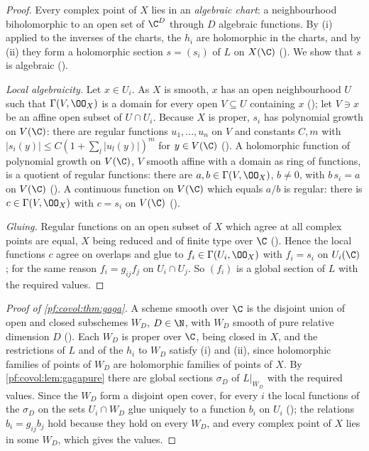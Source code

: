 \begin{proof}
Every complex point of $X$ lies in an \emph{algebraic chart}: a neighbourhood biholomorphic to an open set
of $\C^D$ through $D$ algebraic functions. By (i) applied to the inverses of the charts, the $h_i$ are
holomorphic in the charts, and by (ii) they form a holomorphic section $s=(s_i)$ of $L$ on $X(\C)$
(). We show that $s$ is algebraic
().

\emph{Local algebraicity.} Let $x\in U_i$. As $X$ is smooth, $x$ has an open neighbourhood $U$ such that
$\Gamma(V,\OO_X)$ is a domain for every open $V\subseteq U$ containing $x$
(); let $V\ni x$ be an affine open subset of
$U\cap U_i$. Because $X$ is proper, $s_i$ has polynomial growth on $V(\C)$: there are regular functions
$u_1,\dots,u_n$ on $V$ and constants $C,m$ with $|s_i(y)|\le C(1+\sum_l|u_l(y)|)^m$ for $y\in V(\C)$
(). A holomorphic function of polynomial growth
on $V(\C)$, $V$ smooth affine with a domain as ring of functions, is a quotient of regular functions: there
are $a,b\in\Gamma(V,\OO_X)$, $b\ne0$, with $b\,s_i=a$ on $V(\C)$
(). A continuous function on $V(\C)$
which equals $a/b$ is regular: there is $c\in\Gamma(V,\OO_X)$ with $c=s_i$ on $V(\C)$
().

\emph{Gluing.} Regular functions on an open subset of $X$ which agree at all complex points are equal, $X$
being reduced and of finite type over $\C$
(). Hence the local functions $c$ agree on
overlaps and glue to $f_i\in\Gamma(U_i,\OO_X)$ with $f_i=s_i$ on $U_i(\C)$; for the same reason
$f_i=g_{ij}f_j$ on $U_i\cap U_j$. So $(f_i)$ is a global section of $L$ with the required values.
\end{proof}

\begin{proof}[Proof of \cref{pf:covol:thm:gaga}]
A scheme smooth over $\C$ is the disjoint union of open and closed subschemes $W_D$, $D\in\N$, with $W_D$
smooth of pure relative dimension $D$ ().
Each $W_D$ is proper over $\C$, being closed in $X$, and the restrictions of $L$ and of the $h_i$ to $W_D$
satisfy (i) and (ii), since holomorphic families of points of $W_D$ are holomorphic families of points of
$X$. By \cref{pf:covol:lem:gagapure} there are global sections $\sigma_D$ of $L|_{W_D}$ with the required
values. Since the $W_D$ form a disjoint open cover, for every $i$ the local functions of the $\sigma_D$ on
the sets $U_i\cap W_D$ glue uniquely to a function $b_i$ on $U_i$
(); the relations $b_i=g_{ij}b_j$ hold because they hold on
every $W_D$, and every complex point of $X$ lies in some $W_D$, which gives the values.
\end{proof}

